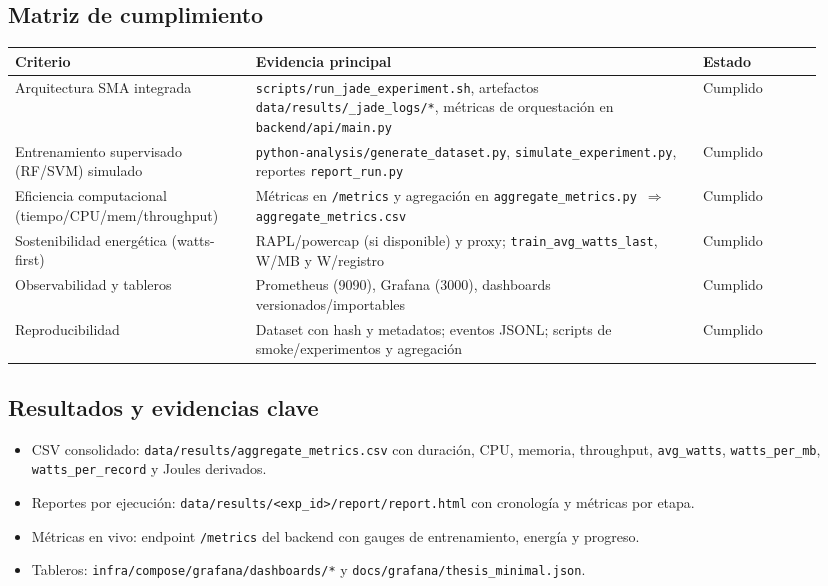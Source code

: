 \subsection*{Matriz de cumplimiento}
\begin{tabular}{p{0.28\linewidth} p{0.52\linewidth} p{0.14\linewidth}}
\toprule
\textbf{Criterio} & \textbf{Evidencia principal} & \textbf{Estado}\\
\midrule
Arquitectura SMA integrada & \verb|scripts/run_jade_experiment.sh|, artefactos \verb|data/results/_jade_logs/*|, métricas de orquestación en \verb|backend/api/main.py| & Cumplido\\
Entrenamiento supervisado (RF/SVM) simulado & \verb|python-analysis/generate_dataset.py|, \verb|simulate_experiment.py|, reportes \verb|report_run.py| & Cumplido\\
Eficiencia computacional (tiempo/CPU/mem/throughput) & Métricas en \verb|/metrics| y agregación en \verb|aggregate_metrics.py| \,$\Rightarrow$\, \verb|aggregate_metrics.csv| & Cumplido\\
Sostenibilidad energética (watts-first) & RAPL/powercap (si disponible) y proxy; \verb|train_avg_watts_last|, W/MB y W/registro & Cumplido\\
Observabilidad y tableros & Prometheus (9090), Grafana (3000), dashboards versionados/importables & Cumplido\\
Reproducibilidad & Dataset con hash y metadatos; eventos JSONL; scripts de smoke/experimentos y agregación & Cumplido\\
\bottomrule
\end{tabular}

\subsection*{Resultados y evidencias clave}
\begin{itemize}
  \item CSV consolidado: \verb|data/results/aggregate_metrics.csv| con duración, CPU, memoria, throughput, \verb|avg_watts|, \verb|watts_per_mb|, \verb|watts_per_record| y Joules derivados.
  \item Reportes por ejecución: \verb|data/results/<exp_id>/report/report.html| con cronología y métricas por etapa.
  \item Métricas en vivo: endpoint \verb|/metrics| del backend con gauges de entrenamiento, energía y progreso.
  \item Tableros: \verb|infra/compose/grafana/dashboards/*| y \verb|docs/grafana/thesis_minimal.json|.
\end{itemize}

